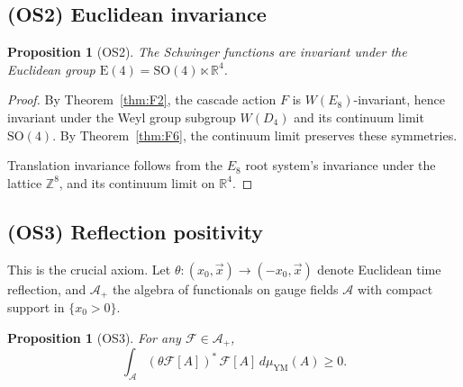 \documentclass[11pt, a4paper]{amsart}
\newtheorem{proposition}[theorem]{Proposition}
\theoremstyle{definition}
\newcommand{\R}{\mathbb{R}}
\newcommand{\Z}{\mathbb{Z}}
\newcommand{\A}{\mathcal{A}}
\begin{document}
\subsection{(OS2) Euclidean invariance}

\begin{proposition}[OS2]\label{prop:OS2}
The Schwinger functions are invariant under the Euclidean group
$\mathrm{E}(4) = \mathrm{SO}(4) \ltimes \R^4$.
\end{proposition}

\begin{proof}
By Theorem~\ref{thm:F2}, the cascade action $F$ is $W(E_8)$-invariant,
hence invariant under the Weyl group subgroup $W(D_4)$ and its
continuum limit $\mathrm{SO}(4)$. By Theorem~\ref{thm:F6}, the
continuum limit preserves these symmetries.

Translation invariance follows from the $E_8$ root system's invariance
under the lattice $\Z^8$, and its continuum limit on $\R^4$.
\end{proof}

\subsection{(OS3) Reflection positivity}

This is the crucial axiom. Let $\theta : (x_0, \vec{x}) \to (-x_0, \vec{x})$
denote Euclidean time reflection, and $\A_+$ the algebra of functionals
on gauge fields $\A$ with compact support in $\{x_0 > 0\}$.

\begin{proposition}[OS3]\label{prop:OS3}
For any $\mathcal{F} \in \A_+$,
\[
\int_\A (\theta \mathcal{F}[A])^* \, \mathcal{F}[A] \, d\mu_{\mathrm{YM}}(A) \geq 0.
\]
\end{proposition}
\end{document}
